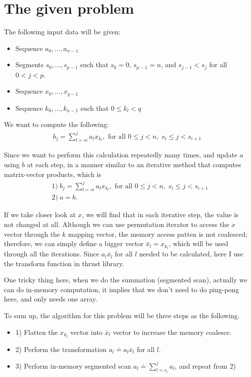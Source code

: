 \documentclass[preprint, prX, amsmath,amssymb]{revtex4-1}
\begin{document}
\maketitle



\section{The given problem}

The following input data will be given:
\begin{itemize}
\item Sequence $a_0,\dots, a_{n-1}$
\item Segments $s_0, \dots, s_{p-1}$ such that $s_0=0$, $s_{p-1}=n$, and $s_{j-1}<s_j$ for all $0<j<p$.
\item Sequence $x_0, \dots, x_{q-1}$
\item Sequence $k_0, \dots, k_{n-1}$ such that $0\leq k_l <q$
\end{itemize}
We want to compute the following:
\begin{align}
    b_j=\sum_{l=si}^j a_l x_{k_l}, \text{ for all } 0\le j<n,\;s_i\le j<s_{i+1}\label{eq:ME}
\end{align}

Since we want to perform this calculation repeatedly many times, and update $a$ using $b$ at each step, in a manner similar to an iterative method that computes matrix-vector products, which is
\begin{align}
   &1)\; b_j=\sum_{l=si}^j a_l x_{k_l}, \text{ for all } 0\le j<n,\;s_i\le j<s_{i+1}\label{eq:ME}\\
   &2)\; a = b.
\end{align}

If we take closer look at $x$, we will find that in each iterative step, the value is not changed at all. Although we can use permutation iterator to access the $x$ vector through the $k$ mapping vector, the memory access patten is not coalesced; therefore, we can simply define a bigger vector $\bar{x}_l = x_{k_l}$, which will be used through all the iterations. Since $a_l\bar{x}_l$ for all $l$ needed to be calculated, here I use the transform function in thrust library. 

One tricky thing here, when we do the summation (segmented scan), actually we can do in-memory computation, it implies that we don't need to do ping-pong here, and only needs one array.

To sum up, the algorithm for this problem will be three steps as the following.
\begin{itemize}
\item 1) Flatten the $x_{k_l}$ vector into $\bar{x}_l$ vector to increase the memory coalesce.   
\item 2) Perform the transformation $a_l \doteq a_l\bar{x}_l$ for all $l$.
\item 3) Perform in-memory segmented scan $a_l \doteq \sum_{l=s_i}^j a_l$, and repeat from 2)
\end{itemize}
\end{document}
